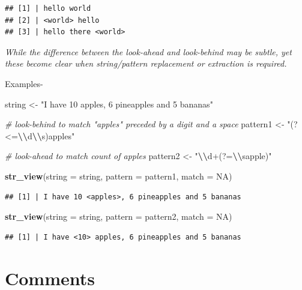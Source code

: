 \documentclass[
]{book}
\newenvironment{Shaded}{\begin{snugshade}}{\end{snugshade}}
\newcommand{\AttributeTok}[1]{\textcolor[rgb]{0.13,0.29,0.53}{#1}}
\newcommand{\CommentTok}[1]{\textcolor[rgb]{0.56,0.35,0.01}{\textit{#1}}}
\newcommand{\ConstantTok}[1]{\textcolor[rgb]{0.56,0.35,0.01}{#1}}
\newcommand{\FunctionTok}[1]{\textcolor[rgb]{0.13,0.29,0.53}{\textbf{#1}}}
\newcommand{\NormalTok}[1]{#1}
\newcommand{\OtherTok}[1]{\textcolor[rgb]{0.56,0.35,0.01}{#1}}
\newcommand{\SpecialCharTok}[1]{\textcolor[rgb]{0.81,0.36,0.00}{\textbf{#1}}}
\newcommand{\StringTok}[1]{\textcolor[rgb]{0.31,0.60,0.02}{#1}}
\begin{document}
\begin{verbatim}
## [1] | hello world
## [2] | <world> hello
## [3] | hello there <world>
\end{verbatim}

\emph{While the difference between the look-ahead and look-behind may be subtle, yet these become clear when string/pattern replacement or extraction is required.}

Examples-

\begin{Shaded}
\begin{Highlighting}[]
\NormalTok{string }\OtherTok{\textless{}{-}} \StringTok{"I have 10 apples, 6 pineapples and 5 bananas"}

\CommentTok{\# look{-}behind to match "apples" preceded by a digit and a space}
\NormalTok{pattern1 }\OtherTok{\textless{}{-}} \StringTok{"(?\textless{}=}\SpecialCharTok{\textbackslash{}\textbackslash{}}\StringTok{d}\SpecialCharTok{\textbackslash{}\textbackslash{}}\StringTok{s)apples"}  

\CommentTok{\# look{-}ahead to match count of apples}
\NormalTok{pattern2 }\OtherTok{\textless{}{-}} \StringTok{"}\SpecialCharTok{\textbackslash{}\textbackslash{}}\StringTok{d+(?=}\SpecialCharTok{\textbackslash{}\textbackslash{}}\StringTok{sapple)"}  

\FunctionTok{str\_view}\NormalTok{(}\AttributeTok{string =}\NormalTok{ string, }\AttributeTok{pattern =}\NormalTok{ pattern1, }\AttributeTok{match =} \ConstantTok{NA}\NormalTok{)}
\end{Highlighting}
\end{Shaded}

\begin{verbatim}
## [1] | I have 10 <apples>, 6 pineapples and 5 bananas
\end{verbatim}

\begin{Shaded}
\begin{Highlighting}[]
\FunctionTok{str\_view}\NormalTok{(}\AttributeTok{string =}\NormalTok{ string, }\AttributeTok{pattern =}\NormalTok{ pattern2, }\AttributeTok{match =} \ConstantTok{NA}\NormalTok{)}
\end{Highlighting}
\end{Shaded}

\begin{verbatim}
## [1] | I have <10> apples, 6 pineapples and 5 bananas
\end{verbatim}

\hypertarget{comments}{%
\section{Comments}\label{comments}}
\end{document}
